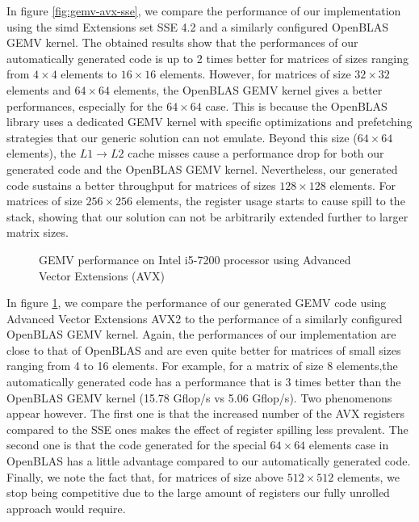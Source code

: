 \documentclass[../main]{subfiles}
\begin{document}
In figure \ref{fig:gemv-avx-sse}, we compare the performance
of our implementation using the \gls{simd} Extensions set SSE 4.2
and a similarly configured OpenBLAS GEMV kernel. The obtained results show
that the performances of our automatically generated code is
up to 2 times better for matrices of sizes ranging from $4 \times 4$
elements to $16 \times 16$ elements. However, for matrices of size
$32 \times 32$ elements and $64 \times 64$ elements, the OpenBLAS GEMV
kernel gives a better performances, especially for the $64 \times 64$
case. This is because the OpenBLAS library uses a dedicated
GEMV kernel with specific optimizations and prefetching
strategies that our generic solution can not emulate. Beyond
this size ($64 \times 64$ elements), the $L1 \rightarrow L2$ cache misses
cause a performance drop for both our generated code and
the OpenBLAS GEMV kernel. Nevertheless, our generated code
sustains a better throughput for matrices of sizes $128 \times 128$
elements. For matrices of size $256 \times 256$ elements, the register
usage starts to cause spill to the stack, showing that our
solution can not be arbitrarily extended further to larger matrix sizes.

\begin{figure}[h]
\fontsize{8}{10}\selectfont

\caption{
  GEMV performance on Intel i5-7200 processor using
  Advanced Vector Extensions (AVX)
}
\label{fig:gemv-avx-bench}
\end{figure}

In figure \ref{fig:gemv-avx-bench}, we compare the performance
of our generated GEMV code using Advanced Vector Extensions
AVX2 to the performance of a similarly configured OpenBLAS GEMV kernel.
Again, the performances of our implementation are close
to that of OpenBLAS and are even quite better for matrices of
small sizes ranging from 4 to 16 elements. For example, for a
matrix of size 8 elements,the automatically generated code has
a performance that is 3 times better than the OpenBLAS GEMV
kernel (15.78 Gflop/s vs 5.06 Gflop/s). Two phenomenons
appear however. The first one is that the increased number
of the AVX registers compared to the SSE ones makes the
effect of register spilling less prevalent. The second one is
that the code generated for the special $64 \times 64$ elements
case\cite{hpcs23} in OpenBLAS has a little advantage compared to
our automatically generated code. Finally, we note the fact
that, for matrices of size above $512 \times 512$ elements, we stop
being competitive due to the large amount of registers our
fully unrolled approach would require.
\end{document}
